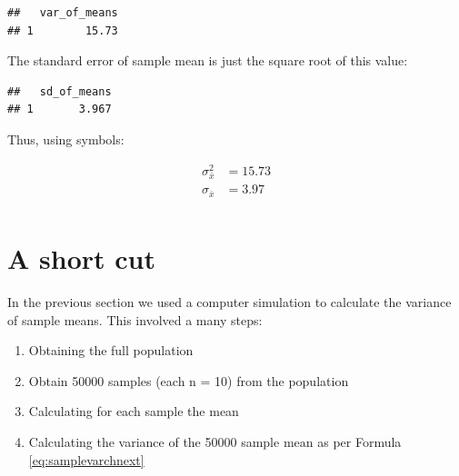 \documentclass[
]{krantz}
\makeatletter
\newenvironment{Shaded}{\begin{snugshade}}{\end{snugshade}}
\newcommand{\DataTypeTok}[1]{\textcolor[rgb]{0.27,0.27,0.27}{#1}}
\newcommand{\KeywordTok}[1]{\textcolor[rgb]{0.27,0.27,0.27}{\textbf{#1}}}
\newcommand{\NormalTok}[1]{#1}
\newcommand{\OperatorTok}[1]{\textcolor[rgb]{0.43,0.43,0.43}{\textbf{#1}}}
\newcommand{\StringTok}[1]{\textcolor[rgb]{0.5,0.5,0.5}{#1}}
\providecommand{\tightlist}{%
  \setlength{\itemsep}{0pt}\setlength{\parskip}{0pt}}
\newenvironment{kframe}{%
\medskip{}
\setlength{\fboxsep}{.8em}
 \def\at@end@of@kframe{}%
 \ifinner\ifhmode%
  \def\at@end@of@kframe{\end{minipage}}%
  \begin{minipage}{\columnwidth}%
 \fi\fi%
 \def\FrameCommand##1{\hskip\@totalleftmargin \hskip-\fboxsep
 \colorbox{shadecolor}{##1}\hskip-\fboxsep
     \hskip-\linewidth \hskip-\@totalleftmargin \hskip\columnwidth}%
 \MakeFramed {\advance\hsize-\width
   \@totalleftmargin\z@ \linewidth\hsize
   \@setminipage}}%
 {\par\unskip\endMakeFramed%
 \at@end@of@kframe}
\renewenvironment{Shaded}{\begin{kframe}}{\end{kframe}}
\makeatother
\begin{document}
\begin{Shaded}
\end{Shaded}

\begin{verbatim}
##   var_of_means
## 1        15.73
\end{verbatim}

The standard error of sample mean is just the square root of this value:

\begin{Shaded}
\end{Shaded}

\begin{verbatim}
##   sd_of_means
## 1       3.967
\end{verbatim}

Thus, using symbols:

\[
\begin{aligned} 
\sigma_{\bar{x}}^2 &= 15.73 \\
\sigma_{\bar{x}} &= 3.97 \\
\end{aligned} 
\]

\hypertarget{a-short-cut}{%
\section{A short cut}\label{a-short-cut}}

In the previous section we used a computer simulation to calculate the variance of sample means. This involved a many steps:

\begin{enumerate}
\def\labelenumi{\arabic{enumi}.}
\tightlist
\item
  Obtaining the full population
\item
  Obtain 50000 samples (each n = 10) from the population
\item
  Calculating for each sample the mean
\item
  Calculating the variance of the 50000 sample mean as per Formula \eqref{eq:samplevarchnext}
\end{enumerate}
\end{document}
